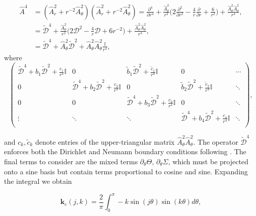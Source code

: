 \documentclass[a4paper]{article}
\begin{document}
\begin{equation}
\begin{aligned}
\hat{A}^4 &= (\hat{A}^2_r + r^{-2} \hat{A}^2_{\theta})(\hat{A}^2_r + r^{-2} \hat{A}^2_{\theta}) = \frac{\partial^4 }{\partial r^4} +\frac{\hat{A}^2_{\theta}}{r^2} \bigg( 2 \frac{\partial^2 }{\partial r^2} - \frac{4}{r} \frac{\partial }{\partial r} + \frac{6}{r^2} \bigg) + \frac{\hat{A}^2_{\theta} \hat{A}^2_{\theta}}{r^4}, \\
&=\tilde{\mathcal{D}}^4 + \frac{\hat{A}^2_{\theta}}{r^2} \big( 2 \mathcal{D}^2 - \frac{4}{r} \mathcal{D} + 6 r^{-2} \big) + \frac{\hat{A}^2_{\theta} \hat{A}^2_{\theta}}{r^4}, \\
&=\tilde{\mathcal{D}}^4 + \hat{A}^2_{\theta} \tilde{\mathcal{D}}^2 + \hat{A}^2_{\theta} \hat{A}^2_{\theta} \frac{\mathbb{I}}{r^4},
\end{aligned}
\end{equation}
\noindent where 
\begin{equation}
\begin{pmatrix}
\tilde{\mathcal{D}}^4 + b_1 \tilde{\mathcal{D}}^2 + \frac{c_1}{r^4} \mathbb{I} & 0 & \tilde{b}_1 \tilde{\mathcal{D}}^2 + \frac{\tilde{c}_1}{r^4} \mathbb{I} & 0 & \cdots \\
0 & \tilde{\mathcal{D}}^4 + b_2 \tilde{\mathcal{D}}^2 + \frac{c_2}{r^4} \mathbb{I} & 0 & \tilde{b}_2 \tilde{\mathcal{D}}^2 + \frac{\tilde{c}_2}{r^4} \mathbb{I} & \ddots \\
0 & 0 & \tilde{\mathcal{D}}^4 + b_3 \tilde{\mathcal{D}}^2 + \frac{c_3}{r^4} \mathbb{I} & 0 & \ddots \\
\vdots & \ddots & \ddots & \tilde{\mathcal{D}}^4 + b_4 \tilde{\mathcal{D}}^2 + \frac{c_4}{r^4} \mathbb{I} & \ddots \\
\end{pmatrix}, 
\label{eq:A4_Discrete_form}
\end{equation}

\noindent and $c_k, \tilde{c}_k$ denote entries of the upper-triangular matrix $\hat{A}^2_{\theta} \hat{A}^2_{\theta}$. The operator $\tilde{\mathcal{D}}^4$ enforces both the Dirichlet and Neumann boundary conditions following \cite{trefethen2000spectral}. The final terms to consider are the mixed terms $\partial_{\theta} \Theta, \, \partial_{\theta} \Sigma$, which must be projected onto a sine basis but contain terms proportional to cosine and sine. Expanding the integral we obtain

\begin{equation}
\boldsymbol{k}_{c}(j,k) = \frac{2}{\pi} \int^{\pi}_{0} -k \sin( j \theta) \sin(k \theta) d \theta, 
\end{equation}
\end{document}
